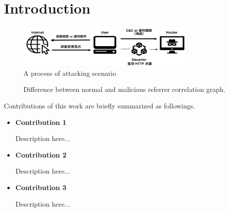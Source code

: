 \section{Introduction}

\begin{figure}[!t]
\centering
\includegraphics[width=250pt]{image/attack.png}
\caption{A process of attacking scenario}
\label{fig:attack}
\end{figure}


\begin{figure}[!tbp]
  \centering
  \hfill
  \caption{Difference between normal and malicious referrer correlation graph.}
\label{fig:length_count}
\end{figure}

Contributions of this work are briefly summarized as followings.

\begin{itemize}

\item {\bf Contribution 1}

Description here...

\item {\bf Contribution 2}

Description here...

\item {\bf Contribution 3}

Description here...

\end{itemize}
